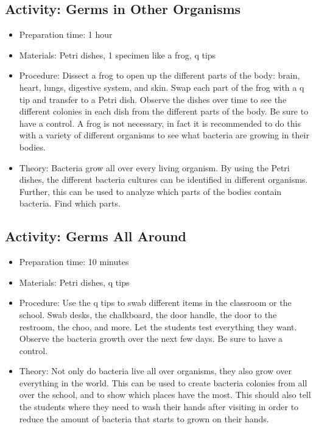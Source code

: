\subsection{Activity: Germs in Other Organisms}
\begin{itemize}
\item{Preparation time: 1 hour}
\item{Materials: Petri dishes, 1 specimen like a frog, q tips}
\item{Procedure: Dissect a frog to open up the different parts of the body: brain, heart, lungs, digestive system, and skin. Swap each part of the frog with a q tip and transfer to a Petri dish. Observe the dishes over time to see the different colonies in each dish from the different parts of the body. Be sure to have a control. A frog is not necessary, in fact it is recommended to do this with a variety of different organisms to see what bacteria are growing in their bodies. }
\item{Theory: Bacteria grow all over every living organism. By using the Petri dishes, the different bacteria cultures can be identified in different organisms. Further, this can be used to analyze which parts of the bodies contain bacteria. Find which parts. }
\end{itemize}

\subsection{Activity: Germs All Around}
\begin{itemize}
\item{Preparation time: 10 minutes}
\item{Materials: Petri dishes, q tips}
\item{Procedure: Use the q tips to swab different items in the classroom or the school. Swab desks, the chalkboard, the door handle, the door to the restroom, the choo, and more. Let the students test everything they want. Observe the bacteria growth over the next few days. Be sure to have a control.}
\item{Theory: Not only do bacteria live all over organisms, they also grow over everything in the world. This can be used to create bacteria colonies from all over the school, and to show which places have the most. This should also tell the students where they need to wash their hands after visiting in order to reduce the amount of bacteria that starts to grown on their hands. }
\end{itemize}

